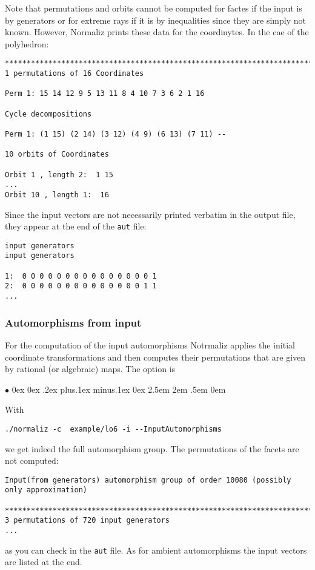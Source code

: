 \documentclass[12pt,a4paper]{scrartcl}
\newcommand{\stdli}{ \topsep0ex \partopsep0ex %
\parsep.2ex plus.1ex minus.1ex \itemsep0ex%
\leftmargin2.5em \labelwidth2em \labelsep.5em \rightmargin0em}%
\renewenvironment{itemize}{\begin{list}{{$\bullet$}}{\stdli}}{\end{list}}
\theoremstyle{definition}
\def\itemtt[#1]{\item[\textbf{\ttt{#1}}]}
\def\ttt{\texttt}
\begin{document}
Note that permutations and orbits cannot be computed for factes if the input is by generators or for extreme rays if it is by inequalities since they are simply not known. However, Normaliz prints these data for the coordinytes. In the cae  of the polyhedron:
\begin{Verbatim}
************************************************************************
1 permutations of 16 Coordinates

Perm 1: 15 14 12 9 5 13 11 8 4 10 7 3 6 2 1 16

Cycle decompositions 

Perm 1: (1 15) (2 14) (3 12) (4 9) (6 13) (7 11) --

10 orbits of Coordinates

Orbit 1 , length 2:  1 15
...
Orbit 10 , length 1:  16
\end{Verbatim}
Since the input vectors  are not necessarily printed verbatim in the output file, they appear at the end of the \verb|aut| file:
\begin{Verbatim}
input generators
input generators

1:  0 0 0 0 0 0 0 0 0 0 0 0 0 0 0 1
2:  0 0 0 0 0 0 0 0 0 0 0 0 0 0 1 1
...
\end{Verbatim}

\subsubsection{Automorphisms from input}

For the computation of the input automorphisms Notrmaliz applies the initial coordinate transformations and then computes  their permutations that are given by rational (or algebraic) maps. The option is
\begin{itemize}
	\itemtt[InputAutomorphisms]
\end{itemize}
With
\begin{Verbatim}
./normaliz -c  example/lo6 -i --InputAutomorphisms
\end{Verbatim}
we get indeed the full automorphism group. The permutations of the facets are not computed:
\begin{Verbatim}
Input(from generators) automorphism group of order 10080 (possibly only approximation)

************************************************************************
3 permutations of 720 input generators
...
\end{Verbatim}
as you can check in the \verb|aut| file. As for ambient automorphisms the input vectors are listed at the end.
\end{document}
